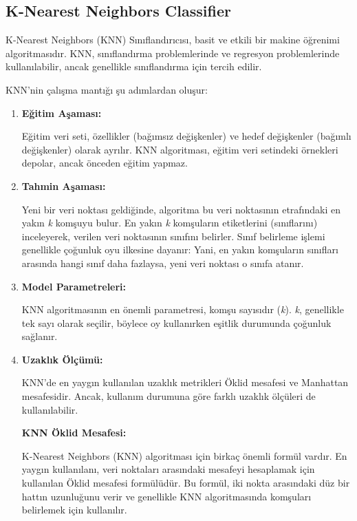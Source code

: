 \documentclass[twocolumn]{article}
\begin{document}
	
	\subsection{K-Nearest Neighbors Classifier}
	
	K-Nearest Neighbors (KNN) Sınıflandırıcısı, basit ve etkili bir makine öğrenimi algoritmasıdır. KNN, sınıflandırma problemlerinde ve regresyon problemlerinde kullanılabilir, ancak genellikle sınıflandırma için tercih edilir.
	
	KNN'nin çalışma mantığı şu adımlardan oluşur:
	
	\begin{enumerate}
		\item \textbf{Eğitim Aşaması:}
		
		Eğitim veri seti, özellikler (bağımsız değişkenler) ve hedef değişkenler (bağımlı değişkenler) olarak ayrılır. KNN algoritması, eğitim veri setindeki örnekleri depolar, ancak önceden eğitim yapmaz.
		
		\item \textbf{Tahmin Aşaması:}
		
		Yeni bir veri noktası geldiğinde, algoritma bu veri noktasının etrafındaki en yakın \textit{k} komşuyu bulur. En yakın \textit{k} komşuların etiketlerini (sınıflarını) inceleyerek, verilen veri noktasının sınıfını belirler. Sınıf belirleme işlemi genellikle çoğunluk oyu ilkesine dayanır: Yani, en yakın komşuların sınıfları arasında hangi sınıf daha fazlaysa, yeni veri noktası o sınıfa atanır.
		
		\item \textbf{Model Parametreleri:}
		
		KNN algoritmasının en önemli parametresi, komşu sayısıdır (\textit{k}). \textit{k}, genellikle tek sayı olarak seçilir, böylece oy kullanırken eşitlik durumunda çoğunluk sağlanır.
		
		\item \textbf{Uzaklık Ölçümü:}
		
		KNN'de en yaygın kullanılan uzaklık metrikleri Öklid mesafesi ve Manhattan mesafesidir. Ancak, kullanım durumuna göre farklı uzaklık ölçüleri de kullanılabilir.
		
		\textbf{KNN Öklid Mesafesi:} \cite{medium_knn}
		
		K-Nearest Neighbors (KNN) algoritması için birkaç önemli formül vardır. En yaygın kullanılanı, veri noktaları arasındaki mesafeyi hesaplamak için kullanılan Öklid mesafesi formülüdür. Bu formül, iki nokta arasındaki düz bir hattın uzunluğunu verir ve genellikle KNN algoritmasında komşuları belirlemek için kullanılır.
		

\end{enumerate}
\end{document}
